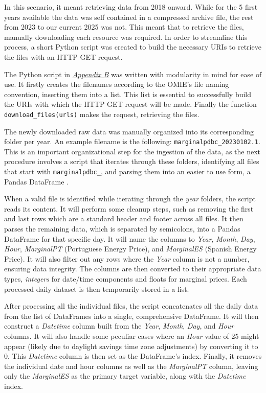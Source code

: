 \documentclass[12pt]{report} %
\begin{document}
In this scenario, it meant retrieving data from 2018 onward. While for the 5 first years available the data was self contained in a compressed archive file, the rest from 2023 to our current 2025 was not. This meant that to retrieve the files, manually downloading each resource was required. In order to streamline this process, a short Python script was created to build the necessary URIs to retrieve the files with an HTTP GET request.

The Python script in \textit{\hyperref[app:appendix_b_data_scrapping]{Appendix B}} was written with modularity in mind for ease of use. It firstly creates the filenames according to the OMIE's file naming convention, inserting them into a list. This list is essential to successfully build the URIs with which the HTTP GET request will be made. Finally the function \small{\verb|download_files(urls)|} makes the request, retrieving the files.

The newly downloaded raw data was manually organized into its corresponding folder per year. An example filename is the following: \small{\verb|marginalpdbc_20230102.1|}. This is an important organizational step for the ingestion of the data, as the next procedure involves a script that iterates through these folders, identifying all files that start with \small{\verb|marginalpdbc_|}, and parsing them into an easier to use form, a Pandas DataFrame \cite{dataframe}.

When a valid file is identified while iterating through the \textit{year} folders, the script reads its content. It will perform some cleanup steps, such as removing the first and last rows which are a standard header and footer across all files. It then parses the remaining data, which is separated by semicolons, into a Pandas DataFrame for that specific day. It will name the columns to \textit{Year}, \textit{Month}, \textit{Day}, \textit{Hour}, \textit{MarginalPT} (Portuguese Energy Price), and \textit{MarginalES} (Spanish Energy Price). It will also filter out any rows where the \textit{Year} column is not a number, ensuring data integrity. The columns are then converted to their appropriate data types, \textit{integers} for date/time components and \textit{}{floats} for marginal prices. Each processed daily dataset is then temporarily stored in a list.

After processing all the individual files, the script concatenates all the daily data from the list of DataFrames into a single, comprehensive DataFrame. It will then construct a \textit{Datetime} column built from the \textit{Year}, \textit{Month}, \textit{Day}, and \textit{Hour} columns. It will also handle some peculiar cases where an \textit{Hour} value of 25 might appear (likely due to daylight savings time zone adjustments) by converting it to 0. This \textit{Datetime} column is then set as the DataFrame's index. Finally, it removes the individual date and hour columns as well as the \textit{MarginalPT} column, leaving only the \textit{MarginalES} as the primary target variable, along with the \textit{Datetime} index.
\end{document}
